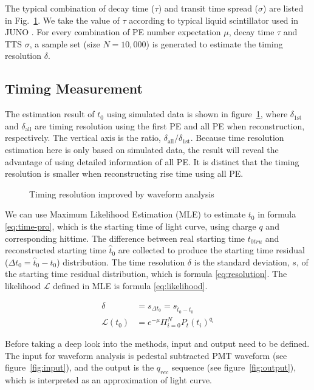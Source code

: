 The typical combination of decay time ($\tau$) and transit time spread ($\sigma$) are listed in Fig.~\ref{fig:reso-diff}. We take the value of $\tau$ according to typical liquid scintillator used in JUNO \cite{ludhova_particle_2020}. For every combination of PE number expectation $\mu$, decay time $\tau$ and TTS $\sigma$, a sample set (size $N=10,000$) is generated to estimate the timing resolution $\delta$. 

\subsection{Timing Measurement}
The estimation result of $t_{0}$ using simulated data is shown in figure~\ref{fig:reso-diff}, where $\delta_{\mathrm{1st}}$ and $\delta_{\mathrm{all}}$ are timing resolution using the first PE and all PE when reconstruction, respectively. The vertical axis is the ratio, $\delta_{\mathrm{all}}/\delta_{\mathrm{1st}}$. Because time resolution estimation here is only based on simulated data, the result will reveal the advantage of using detailed information of all PE. It is distinct that the timing resolution is smaller when reconstructing rise time using all PE. 

\begin{figure}[H]
    \centering
    \scalebox{0.5}{}
    \caption{\label{fig:reso-diff} Timing resolution improved by waveform analysis}
\end{figure}

We can use Maximum Likelihood Estimation (MLE) to estimate $t_{0}$ in formula \eqref{eq:time-pro}, which is the starting time of light curve, using charge $q$ and corresponding hittime. The difference between real starting time $t_{0tru}$ and reconstructed starting time $\hat{t}_0$ are collected to produce the starting time residual ($\Delta t_{0}=\hat{t}_0-t_0$) distribution. The time resolution $\delta$ is the standard deviation, $s$, of the starting time residual distribution, which is formula \eqref{eq:resolution}. The likelihood $\mathcal{L}$ defined in MLE is formula \eqref{eq:likelihood}. 

\begin{align}
  \delta &= s_{\Delta t_{0}} = s_{\hat{t}_0-t_0} \label{eq:resolution} \\
  \mathcal{L}(t_{0}) &= e^{-\mu}\Pi_{i=0}^{N}P_{t}(t_{i})^{q_{i}} \label{eq:likelihood}
\end{align}


Before taking a deep look into the methods, input and output need to be defined. The input for waveform analysis is pedestal subtracted PMT waveform (see figure~\ref{fig:input}), and the output is the $q_{rec}$ sequence (see figure~\ref{fig:output}), which is interpreted as an approximation of light curve. 

